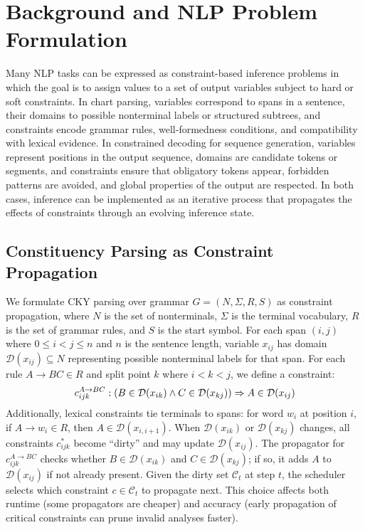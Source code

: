 \documentclass[11pt]{article}
\begin{document}
\section{Background and NLP Problem Formulation}
\label{sec:background}

Many NLP tasks can be expressed as constraint-based inference problems in which the goal is to assign values to a set of output variables subject to hard or soft constraints. In chart parsing, variables correspond to spans in a sentence, their domains to possible nonterminal labels or structured subtrees, and constraints encode grammar rules, well-formedness conditions, and compatibility with lexical evidence. In constrained decoding for sequence generation, variables represent positions in the output sequence, domains are candidate tokens or segments, and constraints ensure that obligatory tokens appear, forbidden patterns are avoided, and global properties of the output are respected. In both cases, inference can be implemented as an iterative process that propagates the effects of constraints through an evolving inference state.

\subsection{Constituency Parsing as Constraint Propagation}

We formulate CKY parsing over grammar $G = (N, \Sigma, R, S)$ as constraint propagation, where $N$ is the set of nonterminals, $\Sigma$ is the terminal vocabulary, $R$ is the set of grammar rules, and $S$ is the start symbol. For each span $(i,j)$ where $0 \leq i < j \leq n$ and $n$ is the sentence length, variable $x_{ij}$ has domain $\mathcal{D}(x_{ij}) \subseteq N$ representing possible nonterminal labels for that span. For each rule $A \to BC \in R$ and split point $k$ where $i < k < j$, we define a constraint:
\begin{equation}
\small
c_{ijk}^{A \to BC}: (B \in \mathcal{D}(x_{ik}) \land C \in \mathcal{D}(x_{kj})) \Rightarrow A \in \mathcal{D}(x_{ij})
\end{equation}
Additionally, lexical constraints tie terminals to spans: for word $w_i$ at position $i$, if $A \to w_i \in R$, then $A \in \mathcal{D}(x_{i,i+1})$. When $\mathcal{D}(x_{ik})$ or $\mathcal{D}(x_{kj})$ changes, all constraints $c_{ijk}^{*}$ become ``dirty'' and may update $\mathcal{D}(x_{ij})$. The propagator for $c_{ijk}^{A \to BC}$ checks whether $B \in \mathcal{D}(x_{ik})$ and $C \in \mathcal{D}(x_{kj})$; if so, it adds $A$ to $\mathcal{D}(x_{ij})$ if not already present. Given the dirty set $\mathcal{C}_t$ at step $t$, the scheduler selects which constraint $c \in \mathcal{C}_t$ to propagate next. This choice affects both runtime (some propagators are cheaper) and accuracy (early propagation of critical constraints can prune invalid analyses faster).
\end{document}
